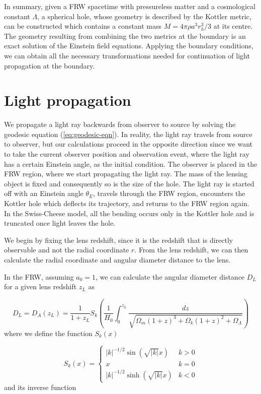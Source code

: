 In summary, given a FRW spacetime with pressureless matter and a cosmological constant $\Lambda$, a spherical hole, whose geometry is described by the Kottler metric, can be constructed which contains a constant mass $M = 4\pi \rho a^3 r_h^3/3$ at its centre. The geometry resulting from combining the two metrics at the boundary is an exact solution of the Einstein field equations. Applying the boundary conditions, we can obtain all the necessary transformations needed for continuation of light propagation at the boundary. 

\section{Light propagation}

We propagate a light ray backwards from observer to source by solving the geodesic equation (\autoref{eq:geodesic-eqn}). In reality, the light ray travels from source to observer, but our calculations proceed in the opposite direction since we want to take the current observer position and observation event, where the light ray has a certain Einstein angle, as the initial condition. The observer is placed in the FRW region, where we start propagating the light ray. The mass of the lensing object is fixed and consequently so is the size of the hole. The light ray is started off with an Einstein angle $\theta_{E}$, travels through the FRW region, encounters the Kottler hole which deflects its trajectory, and returns to the FRW region again. In the Swiss-Cheese model, all the bending occurs only in the Kottler hole and is truncated once light leaves the hole. 

We begin by fixing the lens redshift, since it is the redshift that is directly observable and not the radial coordinate $r$. From the lens redshift, we can then calculate the radial coordinate and angular diameter distance to the lens. 

In the FRW, assuming $a_0 = 1$, we can calculate the angular diameter distance $D_L$ for a given lens redshift $z_L$ as \citep{hogg1999distance}

\begin{equation}
  D_L = D_A(z_L) = \frac{1}{1+z_L} S_k\left ( \frac{1}{H_0}\int_0^{z_L} \frac{dz}{\sqrt{\Omega_m(1+z)^3 + \Omega_k (1+z)^2 + \Omega_{\Lambda}}}  \right )
  \label{eq:angular-diameter-distance-redshit-z}
\end{equation}
where we define the function $S_k(x)$

\begin{equation}
  S_k(x) = 
  \begin{cases}
    \mathopen| k \mathclose|^{-1/2} \sin(\sqrt{\mathopen| k \mathclose|}x) & k > 0\\
    x & k = 0\\
    \mathopen| k \mathclose|^{-1/2} \sinh(\sqrt{\mathopen| k \mathclose|}x) & k < 0
  \end{cases}
  \label{eq:sk}
\end{equation}
and its inverse function


